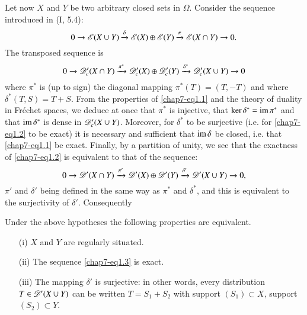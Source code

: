 Let now $X$ and $Y$ be two arbitrary closed sets in $\Omega$. Consider the sequence introduced in (I, 5.4):
\begin{equation}
0\to \mathscr{E}(X\cup Y)\xrightarrow{\delta}\mathscr{E}(X)\oplus \mathscr{E}(Y)\xrightarrow{\pi}\mathscr{E}(X\cap Y)\to 0.\label{chap7-eq1.1}
\end{equation}
The transposed sequence is
\begin{equation}
0\to \mathscr{D}'_{c}(X\cap Y)\xrightarrow{\pi^{*}}\mathscr{D}'_{c}(X)\oplus \mathscr{D}'_{c}(Y)\xrightarrow{\delta^{*}}\mathscr{D}'_{c}(X\cup Y)\to 0\label{chap7-eq1.2}
\end{equation}
where $\pi^{*}$ is (up to sign) the diagonal mapping $\pi^{*}(T)=(T,-T)$ and where $\delta^{*}(T,S)=T+S$. From the properties of \eqref{chap7-eq1.1} and the theory of duality in Fr\'echet spaces, we deduce at once that $\pi^{*}$ is injective, that $\ker \delta^{*}=\operatorname{im} \pi^{*}$ and that $\operatorname{im} \delta^{*}$ is dense in $\mathscr{D}'_{c}(X\cup Y)$. Moreover, for $\delta^{*}$ to be surjective (i.e. for \eqref{chap7-eq1.2} to be exact) it is necessary and sufficient that $\operatorname{im} \delta$ be closed, i.e. that \eqref{chap7-eq1.1} be exact. Finally, by a partition of unity, we see that the exactness of \eqref{chap7-eq1.2} is equivalent to that of the sequence:
\begin{equation}
0\to \mathscr{D}'(X\cap Y)\xrightarrow{\pi'}\mathscr{D}'(X)\oplus \mathscr{D}'(Y)\xrightarrow{\delta'}\mathscr{D}'(X\cup Y)\to 0,\label{chap7-eq1.3}
\end{equation}
$\pi'$ and $\delta'$ being defined in the same way as $\pi^{*}$ and $\delta^{*}$, and this is equivalent to the surjectivity of $\delta'$. Consequently

\setcounter{theorem}{3}
\begin{proposition}\label{chap7-prop1.4}
Under the above hypotheses the following properties are equivalent.
\begin{itemize}
\item[\rm(i)] $X$ and $Y$ are regularly situated.

\item[\rm(ii)] The sequence \eqref{chap7-eq1.3} is exact.

\item[\rm(iii)] The mapping $\delta'$ is surjective: in other words, every distribution $T\in \mathscr{D}'(X\cup Y)$ can be written $T=S_{1}+S_{2}$ with support $(S_{1})\subset X$, support $(S_{2})\subset Y$.
\end{itemize}
\end{proposition}


